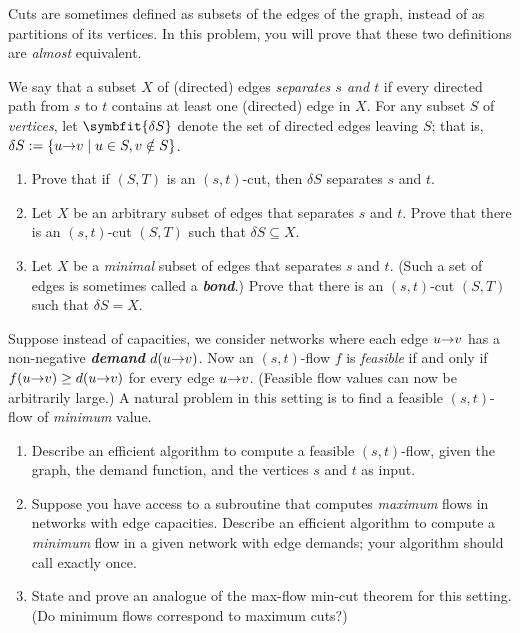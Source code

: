 \begin{exercises}
\item Cuts are sometimes defined as subsets of the edges of the graph, instead of as partitions of its vertices.
In this problem, you will prove that these two definitions are \textit{almost} equivalent.

We say that a subset $X$ of (directed) edges \textit{separates $s$ and $t$} if every directed path from $s$ to $t$ contains at least one (directed) edge in $X$.
For any subset $S$ of \textit{vertices}, let $\symbfit{\delta S}$ denote the set of directed edges leaving $S$; that is, $\delta S := \{u\mathord{\rightarrow}v \mid u \in S, v \notin S\}$.
\begin{enumerate}
\item Prove that if $(S,T)$ is an $(s,t)$-cut, then $\delta S$ separates $s$ and $t$.
\item Let $X$ be an arbitrary subset of edges that separates $s$ and $t$.
Prove that there is an $(s,t)$-cut $(S,T)$ such that $\delta S \subseteq X$.
\item Let $X$ be a \textit{minimal} subset of edges that separates $s$ and $t$.
(Such a set of edges is sometimes called a \textbf{\textit{bond}}.)
Prove that there is an $(s,t)$-cut $(S,T)$ such that $\delta S = X$.
\end{enumerate}

\item Suppose instead of capacities, we consider networks where each edge $u\mathord{\rightarrow}v$ has a non-negative \textbf{\textit{demand}} $d(u\mathord{\rightarrow}v)$.
Now an $(s,t)$-flow $f$ is \textit{feasible} if and only if $f(u\mathord{\rightarrow}v) \ge d(u\mathord{\rightarrow}v)$ for every edge $u\mathord{\rightarrow}v$.
(Feasible flow values can now be arbitrarily large.)
A natural problem in this setting is to find a feasible $(s,t)$-flow of \textit{minimum} value.
\begin{enumerate}
\item Describe an efficient algorithm to compute a feasible $(s,t)$-flow, given the graph, the demand function, and the vertices $s$ and $t$ as input.
\item Suppose you have access to a subroutine  that computes \textit{maximum} flows in networks with edge capacities.
Describe an efficient algorithm to compute a \textit{minimum} flow in a given network with edge demands; your algorithm should call  exactly once.
\item State and prove an analogue of the max-flow min-cut theorem for this setting.
(Do minimum flows correspond to maximum cuts?)
\end{enumerate}


\end{exercises}
